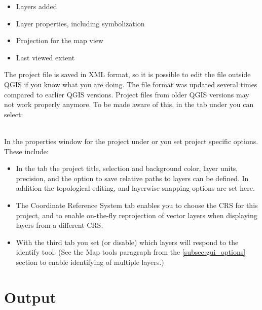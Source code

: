 \begin{itemize}
\item Layers added
\item Layer properties, including symbolization
\item Projection for the map view
\item Last viewed extent
\end{itemize}

The project file is saved in XML format, so it is possible to edit
the file outside QGIS if you know what you are doing. The file format
was updated several times compared to earlier QGIS versions. Project files
from older QGIS versions may not work properly anymore. To be made aware of this,
in the  tab under  \arrow {}
you can select: \\

 \\

In the properties window for the project under  or  you set project specific options. These
include:

\begin{itemize}
\item In the  tab the project title, selection and background
color, layer units, precision, and the option to save relative paths to
layers can be defined. In addition the topological editing, and layerwise
snapping options are set here.
\item The  Coordinate Reference System tab enables you to choose the
CRS for this project, and to enable on-the-fly reprojection of vector layers
when displaying layers from a different CRS.
\item With the third  tab you set (or disable) which
layers will respond to the identify tool. (See the Map tools paragraph from
the \ref{subsec:gui_options} section to enable identifying of multiple layers.)
\end{itemize}

\section{Output}\label{sec:output}

